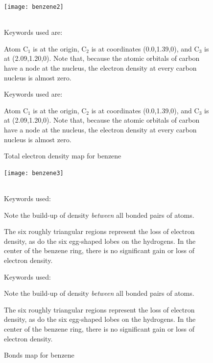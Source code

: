 \begin{figure}
\begin{makeimage}
\end{makeimage}
\begin{center}
\texttt{[image: benzene2]} \\~\\
\begin{latexonly}
\parbox{30em}{Keywords used are:


Atom C$_1$ is at the origin, C$_2$ is at coordinates (0.0,1.39,0),
and C$_3$ is at (2.09,1.20,0).
Note that, because the atomic orbitals of carbon have a node at the
nucleus, the electron density at every carbon nucleus is almost
zero.}
\end{latexonly}
\begin{htmlonly}
Keywords used are:


Atom C$_1$ is at the origin, C$_2$ is at coordinates (0.0,1.39,0),
and C$_3$ is at (2.09,1.20,0).
Note that, because the atomic orbitals of carbon have a node at the
nucleus, the electron density at every carbon nucleus is almost
zero.
\end{htmlonly}
\end{center}
\caption{\label{d_mol}Total electron density map for benzene}
\end{figure}

\begin{figure}
\begin{makeimage}
\end{makeimage}
\begin{center}
\texttt{[image: benzene3]} \\~\\
\begin{latexonly}
\parbox{30em}{Keywords used:


Note the build-up of density {\em between} all bonded pairs of atoms.

The six roughly triangular regions represent the loss of electron density,
as do the six egg-shaped lobes on the hydrogens.  In the center of the
benzene ring, there is no significant gain or loss of electron density.}
\end{latexonly}
\begin{htmlonly}
Keywords used:


Note the build-up of density {\em between} all bonded pairs of atoms.

The six roughly triangular regions represent the loss of electron density,
as do the six egg-shaped lobes on the hydrogens.  In the center of the
benzene ring, there is no significant gain or loss of electron density.
\end{htmlonly}
\end{center}
\caption{\label{d_mol1}Bonds map for benzene}
\end{figure}

